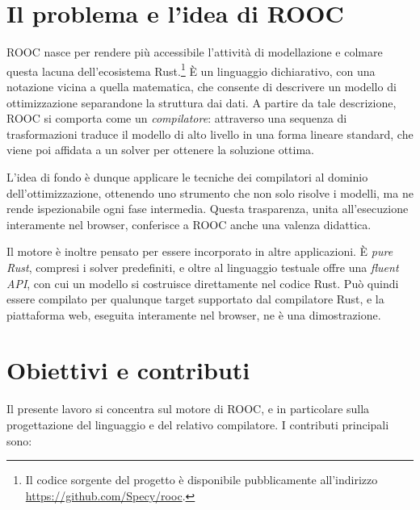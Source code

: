 \section{Il problema e l'idea di ROOC}
\label{sec:idea}

ROOC nasce per rendere più accessibile l'attività di
modellazione e colmare questa lacuna dell'ecosistema
Rust.\footnote{Il codice sorgente del progetto è disponibile
pubblicamente all'indirizzo \url{https://github.com/Specy/rooc}.} È un
linguaggio dichiarativo, con una notazione vicina a quella matematica, che
consente di descrivere un modello di ottimizzazione separandone la struttura dai
dati. A partire da tale descrizione, ROOC si comporta come un \emph{compilatore}:
attraverso una sequenza di trasformazioni traduce il modello di alto livello in
una forma lineare standard, che viene poi affidata a un solver per ottenere la
soluzione ottima.

L'idea di fondo è dunque applicare le tecniche dei compilatori al dominio
dell'ottimizzazione, ottenendo uno strumento che non solo risolve i modelli, ma
ne rende ispezionabile ogni fase intermedia. Questa trasparenza, unita
all'esecuzione interamente nel browser, conferisce a ROOC anche una valenza
didattica.

Il motore è inoltre pensato per essere incorporato in altre applicazioni. È
\emph{pure Rust}, compresi i solver predefiniti, e oltre al linguaggio testuale
offre una \emph{fluent API}, con cui un modello si costruisce direttamente nel
codice Rust. Può quindi essere compilato per qualunque target supportato dal
compilatore Rust, e la piattaforma web, eseguita interamente nel browser, ne è
una dimostrazione.

\section{Obiettivi e contributi}
\label{sec:contributi}

Il presente lavoro si concentra sul motore di ROOC, e in particolare sulla
progettazione del linguaggio e del relativo compilatore. I contributi principali
sono:

